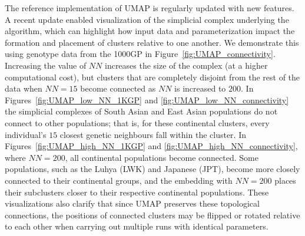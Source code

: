The reference implementation of UMAP is regularly updated with new features\citep{mcinnes2018software}. A recent update enabled visualization of the simplicial complex underlying the algorithm, which can highlight how input data and parameterization impact the formation and placement of clusters relative to one another. We demonstrate this using genotype data from the 1000GP in Figure~\ref{fig:UMAP_connectivity}. Increasing the value of $NN$ increases the size of the complex (at a higher computational cost), but clusters that are completely disjoint from the rest of the data when $NN=15$ become connected as $NN$ is increased to $200$. In Figures~\ref{fig:UMAP_low_NN_1KGP} and \ref{fig:UMAP_low_NN_connectivity} the simplicial complexes of South Asian and East Asian populations do not connect to other populations; that is, for these continental clusters, every individual's $15$ closest genetic neighbours fall within the cluster. In Figures~\ref{fig:UMAP_high_NN_1KGP} and \ref{fig:UMAP_high_NN_connectivity}, where $NN=200$, all continental populations become connected. Some populations, such as the Luhya (LWK) and Japanese (JPT), become more closely connected to their continental groups, and the embedding with $NN=200$ places their subclusters closer to their respective continental populations. These visualizations also clarify that since UMAP preserves these topological connections, the positions of connected clusters may be flipped or rotated relative to each other when carrying out multiple runs with identical parameters.

\clearpage

